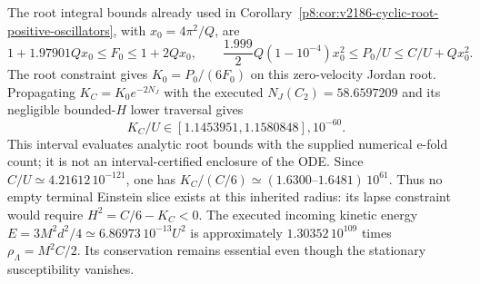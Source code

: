 \documentclass[12pt,a4paper]{article}
\begin{document}
The root integral bounds already used in
Corollary~\ref{p8:cor:v2186-cyclic-root-positive-oscillators}, with
$x_0=4\pi^2/Q$, are
\[
 1+1.97901Qx_0\le F_0\le1+2Qx_0,\qquad
 \frac{1.999}{2}Q(1-10^{-4})x_0^2
 \le P_0/U\le C/U+Qx_0^2.
\]
The root constraint gives $K_0=P_0/(6F_0)$ on this zero-velocity
Jordan root.  Propagating $K_C=K_0e^{-2N_J}$ with the executed
$N_J(C_2)=58.6597209$ and its negligible bounded-$H$ lower traversal
gives
\[
 K_C/U\in[1.1453951,1.1580848],10^{-60}.
\]
This interval evaluates analytic root bounds with the supplied numerical
e-fold count; it is not an interval-certified enclosure of the ODE.
Since $C/U\simeq4.21612\,10^{-121}$, one has
$K_C/(C/6)\simeq(1.6300\text{--}1.6481)\,10^{61}$.
Thus no empty terminal Einstein slice exists at this inherited radius:
its lapse constraint would require $H^2=C/6-K_C<0$.
The executed incoming kinetic energy
$E=3M^2d^2/4\simeq6.86973\,10^{-13}U^2$ is approximately
$1.30352\,10^{109}$ times $\rho_\Lambda=M^2C/2$.
Its conservation remains essential even though the stationary
susceptibility vanishes.
\end{document}
